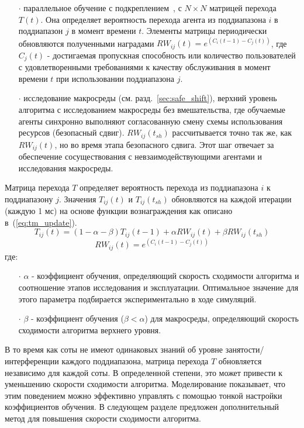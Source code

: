 \begin{itemize}
\item[$\cdot$] параллельное обучение с подкреплением~\cite{4445757}, с $N\times N$ матрицей перехода $T(t)$. Она определяет вероятность перехода агента из поддиапазона $i$ в поддиапазон $j$ в момент времени $t$. Элементы матрицы периодически обновляются полученными наградами $RW_{ij}(t) = e^{(C_i(t-1) - C_j(t))}$, где $C_j(t)$ - достигаемая пропускная способность или количество пользователей с удовлетворенными требованиями к качеству обслуживания в момент времени $t$ при использовании поддиапазона $j$.
\item[$\cdot$] исследование макросреды (см. разд.~\ref{sec:safe_shift}), верхний уровень алгоритма с исследованием макросреды без вмешательства, где обучаемые агенты синхронно выполняют согласованную смену схемы использования ресурсов (безопасный сдвиг). $RW_{ij}(t_{sh})$ рассчитывается точно так же, как $RW_{ij}(t)$, но во время этапа безопасного сдвига. Этот шаг отвечает за обеспечение сосуществования с невзаимодействующими агентами и исследования макросреды.
\end{itemize}

Матрица перехода $T$ определяет вероятность перехода из поддиапазона $i$ к поддиапазону $j$. Значения $T_{ij}(t)$ и $T_{ij}(t_{sh})$ обновляются на каждой итерации (каждую 1 мс) на основе функции вознаграждения как описано в~(\ref{eq:tm_update}).
\begin{equation}
    \label{eq:tm_update}
    T_{ij}(t) = (1-\alpha-\beta)T_{ij}(t-1) + \alpha RW_{ij}(t) + \beta RW_{ij}(t_{sh})
\end{equation}
\begin{equation}
    \label{eq:tm_update_c}
    RW_{ij}(t) = e^{(C_i(t-1) - C_j(t))}
\end{equation}
где:

\begin{itemize}
\item[$\cdot$]$ \alpha$ - коэффициент обучения, определяющий скорость сходимости алгоритма и соотношение этапов исследования и эксплуатации. Оптимальное значение для этого параметра подбирается экспериментально в ходе симуляций.
\item[$\cdot$] $\beta$ - коэффициент обучения ($\beta < \alpha$) для макросреды, определяющий скорость сходимости алгоритма верхнего уровня.
\end{itemize}

В то время как соты не имеют одинаковых знаний об уровне занятости/интерференции каждого поддиапазона, матрица перехода $T$ обновляется независимо для каждой соты. В определенной степени, это может привести к уменьшению скорости сходимости алгоритма. Моделирование показывает, что этим поведением можно эффективно управлять с помощью тонкой настройки коэффициентов обучения. В следующем разделе предложен дополнительный метод для повышения скорости сходимости алгоритма.

